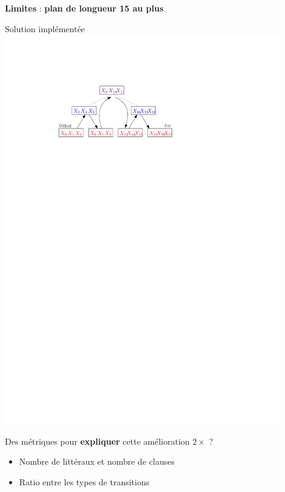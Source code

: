 \documentclass[english,french,usenames,dvipsnames]{beamer}
\begin{document}
\begin{frame}{\subsecname}
\textbf{Limites} : \textbf{plan de longueur 15 au plus}
\begin{exampleblock}{Solution implémentée}
\includegraphics[width=0.9\textwidth]{figures/coplas2018/planif-tree-5.pdf}
\end{exampleblock}
\end{frame}

\begin{frame}{\subsecname}
Des métriques pour \textbf{expliquer} cette amélioration \textbf{$2\times$} ?
\begin{itemize}
\item Nombre de littéraux et nombre de clauses
\item Ratio entre les types de transitions
\end{itemize}
\end{frame}
\end{document}
